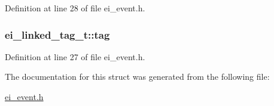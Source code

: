 Definition at line 28 of file ei\-\_\-event.\-h.

\hypertarget{structei__linked__tag__t_aa1c771b8b7ac760ee10d33d5a29c97d7}{
\subsubsection[{tag}]{ ei\-\_\-linked\-\_\-tag\-\_\-t\-::tag}}\label{structei__linked__tag__t_aa1c771b8b7ac760ee10d33d5a29c97d7}


Definition at line 27 of file ei\-\_\-event.\-h.



The documentation for this struct was generated from the following file\-:\begin{DoxyCompactItemize}
\item 
\hyperlink{ei__event_8h}{ei\-\_\-event.\-h}\end{DoxyCompactItemize}
